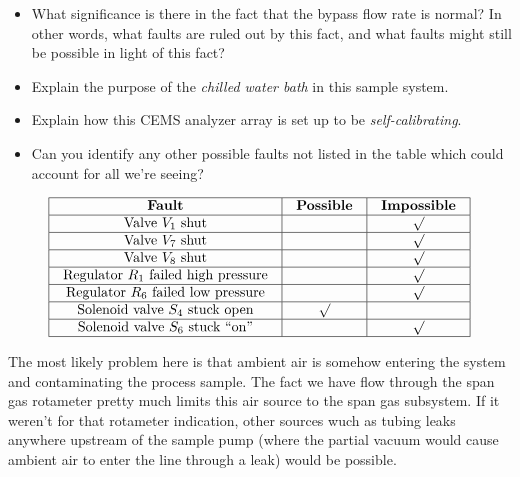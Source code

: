 \begin{itemize}
\item{} What significance is there in the fact that the bypass flow rate is normal?  In other words, what faults are ruled out by this fact, and what faults might still be possible in light of this fact?
\item{} Explain the purpose of the {\it chilled water bath} in this sample system.
\item{} Explain how this CEMS analyzer array is set up to be {\it self-calibrating}.
\item{} Can you identify any other possible faults not listed in the table which could account for all we're seeing?
\end{itemize}
















$$\vbox{\offinterlineskip
\halign{\strut
\vrule \quad\hfil # \ \hfil & 
\vrule \quad\hfil # \ \hfil & 
\vrule \quad\hfil # \ \hfil \vrule \cr
\noalign{\hrule}
%
{\bf Fault} & {\bf Possible} & {\bf Impossible} \cr
%
\noalign{\hrule}
%
Valve $V_1$ shut &  & $\surd$ \cr
%
\noalign{\hrule}
%
Valve $V_7$ shut &  & $\surd$ \cr
%
\noalign{\hrule}
%
Valve $V_8$ shut &  & $\surd$ \cr
%
\noalign{\hrule}
%
Regulator $R_1$ failed high pressure &  & $\surd$ \cr
%
\noalign{\hrule}
%
Regulator $R_6$ failed low pressure &  & $\surd$ \cr
%
\noalign{\hrule}
%
Solenoid valve $S_4$ stuck open & $\surd$ &  \cr
%
\noalign{\hrule}
%
Solenoid valve $S_6$ stuck ``on'' &  & $\surd$ \cr
%
\noalign{\hrule}
} %
}$$ %

The most likely problem here is that ambient air is somehow entering the system and contaminating the process sample.  The fact we have flow through the span gas rotameter pretty much limits this air source to the span gas subsystem.  If it weren't for that rotameter indication, other sources wuch as tubing leaks anywhere upstream of the sample pump (where the partial vacuum would cause ambient air to enter the line through a leak) would be possible.



